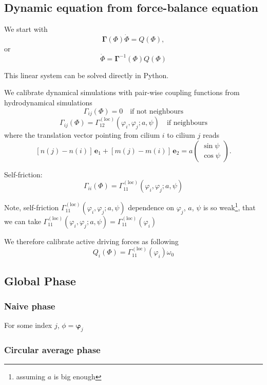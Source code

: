 \documentclass[a4paper,10pt]{article}
\begin{document}
\subsection{Dynamic equation from force-balance equation}

We start with
$$  \mathbf{\Gamma}(\Phi) \dot{\Phi} =Q(\Phi),$$
or
\begin{equation}
\dot{\Phi} = \mathbf{\Gamma}^{-1}(\Phi)Q(\Phi) 
\label{eqn:phi_gamma}
\end{equation}


This linear system can be solved directly in Python.

We calibrate dynamical simulations with pair-wise coupling functions from hydrodynamical simulations
$$ \Gamma_{ij}(\Phi) = 0 \quad \text{if not neighbours} $$
$$ \Gamma_{ij}(\Phi) = \Gamma_{12}^{\mathrm{(loc)}}(\varphi_i,\varphi_j; a, \psi) \quad \text{if neighbours} $$
where the translation vector pointing from cilium $i$ to cilium $j$ reads
$$[n(j)-n(i)]\,\mathbf{e}_1 + [m(j)-m(i)]\,\mathbf{e}_2 = a \left( \begin{array}{c} \sin\psi \\ \cos\psi \end{array} \right).$$

Self-friction:
$$ \Gamma_{ii}(\Phi) = \Gamma_{11}^{\mathrm{(loc)}}(\varphi_i, \varphi_j; a, \psi) $$

Note, self-friction $\Gamma_{11}^{\mathrm{(loc)}}(\varphi_i, \varphi_j; a, \psi) $ dependence on $\varphi_j$, $a$, $\psi$ is so weak\footnote{assuming $a$ is big enough}, that we can take
$\Gamma_{11}^{\mathrm{(loc)}}(\varphi_i, \varphi_j; a, \psi)= \Gamma_{11}^{\mathrm{(loc)}}(\varphi_i)$

We therefore calibrate active driving forces as following
$$ Q_{i}(\Phi) = \Gamma_{11}^{\mathrm{(loc)}}(\varphi_i) \omega_0 $$


\subsection{Global Phase}

\subsubsection{Naive phase}
For some index $j$, $\phi = \mathbf{\varphi}_j$

\subsubsection{Circular average phase}
\end{document}
